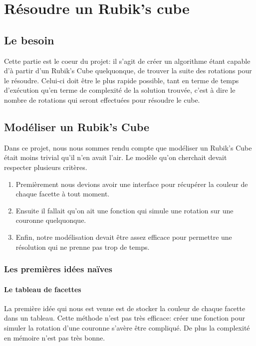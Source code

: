 \chapter{Résoudre un Rubik's cube}

\section{Le besoin}
Cette partie est le coeur du projet: il s'agit de créer un algorithme étant capable d'à partir d'un Rubik's Cube quelquonque, de trouver la suite des rotations pour le résoudre. Celui-ci doit être le plus rapide possible, tant en terme de temps d'exécution qu'en terme de complexité de la solution trouvée, c'est à dire le nombre de rotations qui seront effectuées pour résoudre le cube.

\section{Modéliser un Rubik's Cube}

Dans ce projet, nous nous sommes rendu compte que modéliser un Rubik's Cube était moins trivial qu'il n'en avait l'air.
Le modèle qu'on cherchait devait respecter plusieurs critères. 
\begin{enumerate}
    \item Premièrement nous devions avoir une interface pour récupérer la couleur de chaque facette à tout moment.
    \item Ensuite il fallait qu'on ait une fonction qui simule une rotation sur une couronne quelquonque.
    \item Enfin, notre modélisation devait être assez efficace pour permettre une résolution qui ne prenne pas trop de temps.
\end{enumerate}
\subsection{Les premières idées naïves}

\subsubsection{Le tableau de facettes}
La première idée qui nous est venue est de stocker la couleur de chaque facette dans un tableau.
Cette méthode n'est pas très efficace: créer une fonction pour simuler la rotation d'une couronne s'avère être compliqué.
De plus la complexité en mémoire n'est pas très bonne.

